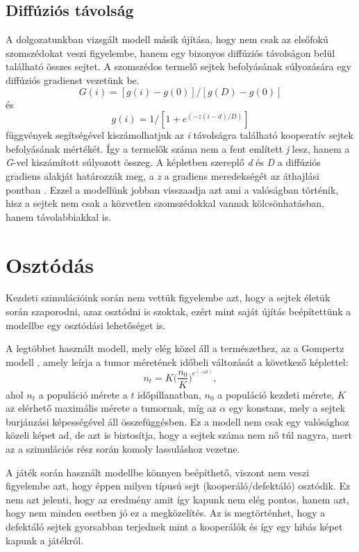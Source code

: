 \subsection{Diffúziós távolság}
A dolgozatunkban vizsgált modell másik újítása, hogy nem csak az elsőfokú szomszédokat veszi figyelembe, hanem egy bizonyos diffúziós távolságon belül található összes sejtet. A szomszédos termelő sejtek befolyásának súlyozására egy diffúziós gradienst vezetünk be. 
\begin{equation}
G(i) = [g(i) - g(0)]/[g(D) - g(0)] 
\end{equation}
és
\begin{equation} \label{eq:diffGradient}
g(i) = 1/[1 + e^{(-z(i-d)/D)}]
\end{equation}
függvények segítségével kiszámolhatjuk az \textit{i} távolságra található kooperatív sejtek befolyásának mértékét. Így a termelők száma nem a fent említett \textit{j} lesz, hanem a \textit{G}-vel kiszámított súlyozott összeg. A képletben szereplő \textit{d} és \textit{D} a diffúziós gradiens alakját határozzák meg, a \textit{z} a gradiens meredekségét az áthajlási pontban \cite{archetti2016cooperation}. Ezzel a modellünk jobban visszaadja azt ami a valóságban történik, hisz a sejtek nem csak a közvetlen szomszédokkal vannak kölcsönhatásban, hanem távolabbiakkal is.

\section{Osztódás}
Kezdeti szimulációink során nem vettük figyelembe azt, hogy a sejtek életük során szaporodni, azaz osztódni is szoktak, ezért mint saját újítás beépítettünk a modellbe egy osztódási lehetőséget is. 

A legtöbbet használt modell, mely elég közel áll a természethez, az a Gompertz modell \cite{wiki:gompertz}, amely leírja a tumor méretének időbeli változását a következő képlettel:
\begin{equation}
	n_t = K \bigg(\frac{n_0}{K} \bigg) ^ {e^{(- \alpha t)}},
\end{equation}
ahol $n_t$ a populáció mérete a $t$ időpillanatban, $n_0$ a populáció kezdeti mérete, $K$ az elérhető maximális mérete a tumornak, míg az $\alpha$ egy konstans, mely a sejtek burjánzási képességével áll összefüggésben. Ez a modell nem csak egy valósághoz közeli képet ad, de azt is biztosítja, hogy a sejtek száma nem nő túl nagyra, mert az a szimulációs rész során komoly lassuláshoz vezetne. 

A játék során használt modellbe könnyen beépíthető, viszont nem veszi figyelembe azt, hogy éppen milyen típusú sejt (kooperáló/defektáló) osztódik. Ez nem azt jelenti, hogy az eredmény amit így kapunk nem elég pontos, hanem azt, hogy nem minden esetben jó ez a megközelítés. Az is megtörténhet, hogy a defektáló sejtek gyorsabban terjednek mint a kooperálók és így egy hibás képet kapunk a játékról.